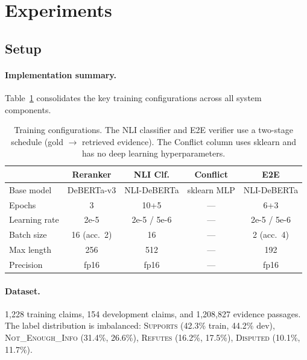 \documentclass[11pt]{article}
\begin{document}
\section{Experiments}

\subsection{Setup}

\paragraph{Implementation summary.}
Table~\ref{tab:hyperparams} consolidates the key training
configurations across all system components.

\begin{table}[t]
\centering
\scriptsize
\begin{tabular}{@{}lcccc@{}}
\toprule
& \textbf{Reranker} & \textbf{NLI Clf.} & \textbf{Conflict} & \textbf{E2E} \\
\midrule
Base model & DeBERTa-v3 & NLI-DeBERTa & sklearn MLP & NLI-DeBERTa \\
Epochs & 3 & 10+5 & --- & 6+3 \\
Learning rate & 2e-5 & 2e-5 / 5e-6 & --- & 2e-5 / 5e-6 \\
Batch size & 16 (acc.\ 2) & 16 & --- & 2 (acc.\ 4) \\
Max length & 256 & 512 & --- & 192 \\
Precision & fp16 & fp16 & --- & fp16 \\
\bottomrule
\end{tabular}
\caption{Training configurations. The NLI classifier and E2E verifier
use a two-stage schedule (gold $\to$ retrieved evidence). The Conflict
column uses sklearn and has no deep learning hyperparameters.}
\label{tab:hyperparams}
\end{table}

\paragraph{Dataset.}
1{,}228 training claims, 154 development claims, and 1{,}208{,}827
evidence passages.
The label distribution is imbalanced: \textsc{Supports} (42.3\% train,
44.2\% dev), \textsc{Not\_Enough\_Info} (31.4\%, 26.6\%),
\textsc{Refutes} (16.2\%, 17.5\%), \textsc{Disputed} (10.1\%, 11.7\%).
\end{document}
